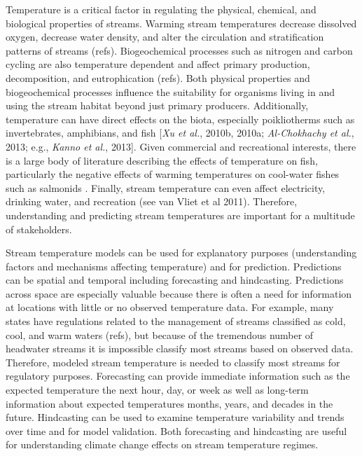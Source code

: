 Temperature is a critical factor in regulating the physical, chemical,
and biological properties of streams. Warming stream temperatures
decrease dissolved oxygen, decrease water density, and alter the
circulation and stratification patterns of streams (refs).
Biogeochemical processes such as nitrogen and carbon cycling are also
temperature dependent and affect primary production, decomposition, and
eutrophication (refs). Both physical properties and biogeochemical
processes influence the suitability for organisms living in and using
the stream habitat beyond just primary producers. Additionally,
temperature can have direct effects on the biota, especially
poikliotherms such as invertebrates, amphibians, and fish {[}\emph{Xu et
al.}, 2010b, 2010a; \emph{Al-Chokhachy et al.}, 2013; e.g., \emph{Kanno
et al.}, 2013{]}. Given commercial and recreational interests, there is
a large body of literature describing the effects of temperature on
fish, particularly the negative effects of warming temperatures on
cool-water fishes such as salmonids . Finally, stream temperature can
even affect electricity, drinking water, and recreation (see van Vliet
et al 2011). Therefore, understanding and predicting stream temperatures
are important for a multitude of stakeholders.

Stream temperature models can be used for explanatory purposes
(understanding factors and mechanisms affecting temperature) and for
prediction. Predictions can be spatial and temporal including
forecasting and hindcasting. Predictions across space are especially
valuable because there is often a need for information at locations with
little or no observed temperature data. For example, many states have
regulations related to the management of streams classified as cold,
cool, and warm waters (refs), but because of the tremendous number of
headwater streams it is impossible classify most streams based on
observed data. Therefore, modeled stream temperature is needed to
classify most streams for regulatory purposes. Forecasting can provide
immediate information such as the expected temperature the next hour,
day, or week as well as long-term information about expected
temperatures months, years, and decades in the future. Hindcasting can
be used to examine temperature variability and trends over time and for
model validation. Both forecasting and hindcasting are useful for
understanding climate change effects on stream temperature regimes.


